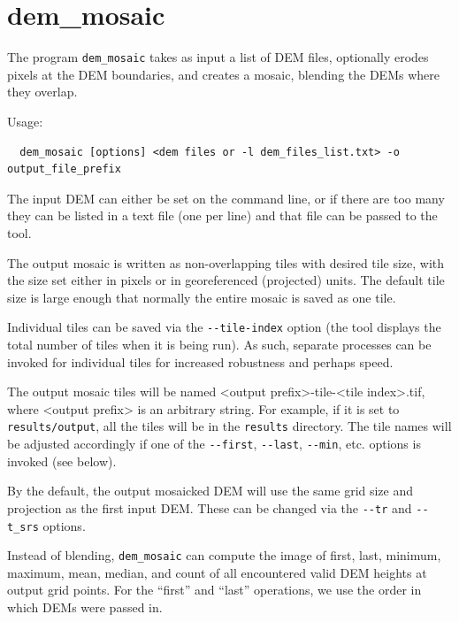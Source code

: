 \clearpage

\section{dem\_mosaic}
\label{demmosaic}

The program \texttt{dem\_mosaic} takes as input a list of \ac{DEM} files,
optionally erodes pixels at the \ac{DEM} boundaries, and creates a mosaic,
blending the \acp{DEM} where they overlap.

Usage:
\begin{verbatim}
  dem_mosaic [options] <dem files or -l dem_files_list.txt> -o output_file_prefix
\end{verbatim}

The input \ac{DEM} can either be set on the command line, or if there are too
many they can be listed in a text file (one per line) and that file can
be passed to the tool.

The output mosaic is written as non-overlapping tiles with desired tile
size, with the size set either in pixels or in georeferenced (projected)
units. The default tile size is large enough that normally the entire
mosaic is saved as one tile.

Individual tiles can be saved via the \texttt{-\/-tile-index} option
(the tool displays the total number of tiles when it is being run). As
such, separate processes can be invoked for individual tiles for
increased robustness and perhaps speed.

The output mosaic tiles will be named <output prefix>-tile-<tile
index>.tif, where <output prefix> is an arbitrary string. For example,
if it is set to \texttt{results/output}, all the tiles will be in the
\texttt{results} directory. The tile names will be adjusted accordingly
if one of the \texttt{-\/-first}, \texttt{-\/-last}, \texttt{-\/-min},
etc. options is invoked (see below).

By the default, the output mosaicked \ac{DEM} will use the same grid size and
projection as the first input \ac{DEM}. These can be changed via the
\texttt{-\/-tr} and \texttt{-\/-t\_srs} options.

Instead of blending, \texttt{dem\_mosaic} can compute the image of
first, last, minimum, maximum, mean, median, and count of all
encountered valid \ac{DEM} heights at output grid points. For the
``first'' and ``last'' operations, we use the order in which \acp{DEM}
were passed in.

